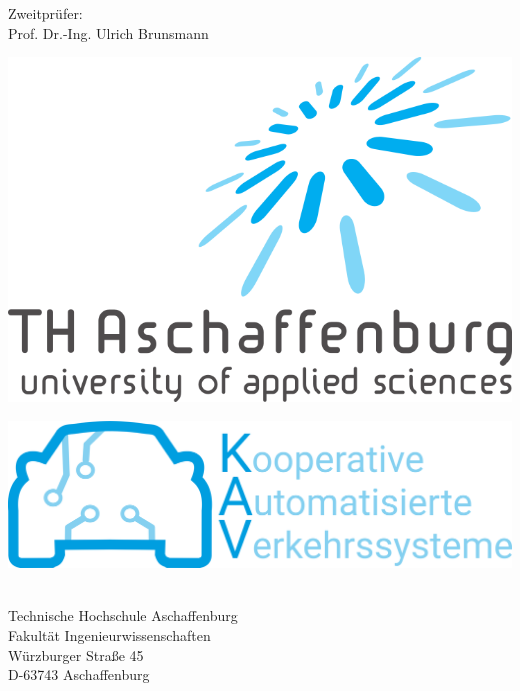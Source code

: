 \begin{titlepage}
\begin{flushleft}
	    \noindent Zweitprüfer:\\
	    \vspace{1ex}
	    Prof.  Dr.-Ing. Ulrich Brunsmann\\
	    \vspace{5ex}
     
      \vspace{5ex}
          \begin{minipage}[b]{0.4\textwidth}
      	\includegraphics[scale=0.25]{Bilder/thab_logo.png}\\
      \end{minipage}
      \hfill
      \begin{minipage}[b]{0.4\textwidth}
      	\includegraphics[scale=0.06]{Bilder/kav_logo.png}\\
      \end{minipage}
      \vspace{6ex}
      \noindent \\Technische Hochschule Aschaffenburg\\
      Fakultät Ingenieurwissenschaften\\
      Würzburger Straße 45\\
      D-63743 Aschaffenburg
      \vfill
   \end{flushleft}


\newpage
\end{titlepage}
